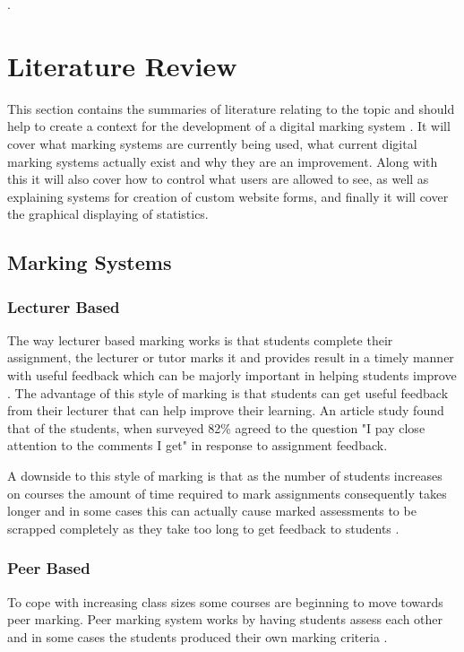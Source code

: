 \documentclass[12pt]{article}  %
\begin{document}
.%




\newpage
\section{Literature Review}
This section contains the summaries of literature relating to the topic and should help to create a context for the development of a digital marking system . It will cover what marking systems are currently being used, what current digital marking systems  actually exist and why they are an improvement. Along with this it will also cover how to control what users are allowed to see, as well as explaining systems for creation of custom website forms, and finally it will cover the graphical displaying of statistics.




\subsection{Marking Systems}


\subsubsection{Lecturer Based}
The way lecturer based marking works is that students complete their assignment, the lecturer or tutor marks it and provides result in a timely manner with useful feedback which can be majorly important in helping students improve \cite{tang_investigating_2011}.
The advantage of this style of marking is that students can get useful feedback from their lecturer that can help improve their learning.  An article study \cite{higgins_conscientious_2002} found that of the students, when surveyed 82\% agreed to the question "I pay close attention to the comments I get" in response to assignment feedback.


A downside to this style of marking is that as the number of students increases on courses the amount of time required to mark assignments consequently takes longer and in some cases this can actually cause marked assessments to be scrapped completely as they take too long to get feedback to students \cite{brown_assessment_1999}.




\subsubsection{Peer Based}
To cope with increasing class sizes some courses are beginning to move towards peer marking. Peer marking system works by having students assess each other and in some cases  the students produced their own marking criteria \cite{orsmond_use_2000}.
\end{document}
